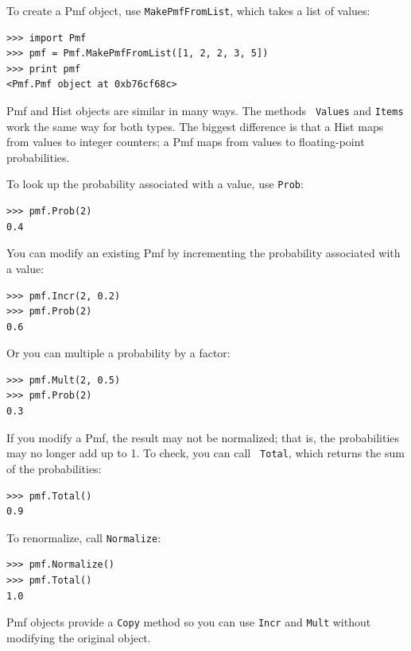 \documentclass[12pt]{book}
\begin{document}
To create a Pmf object, use {\tt MakePmfFromList}, which takes a list
of values:

\begin{verbatim}
>>> import Pmf
>>> pmf = Pmf.MakePmfFromList([1, 2, 2, 3, 5])
>>> print pmf
<Pmf.Pmf object at 0xb76cf68c>
\end{verbatim}

Pmf and Hist objects are similar in many ways.  The methods {\tt
  Values} and {\tt Items} work the same way for both types.  The
biggest difference is that a Hist maps from values to integer
counters; a Pmf maps from values to floating-point probabilities.

To look up the probability associated with a value, use {\tt Prob}:

\begin{verbatim}
>>> pmf.Prob(2)
0.4
\end{verbatim}

You can modify an existing Pmf by incrementing the probability
associated with a value:

\begin{verbatim}
>>> pmf.Incr(2, 0.2)
>>> pmf.Prob(2)
0.6
\end{verbatim}

Or you can multiple a probability by a factor:

\begin{verbatim}
>>> pmf.Mult(2, 0.5)
>>> pmf.Prob(2)
0.3
\end{verbatim}

If you modify a Pmf, the result may not be normalized; that is, the
probabilities may no longer add up to 1.  To check, you can call {\tt
  Total}, which returns the sum of the probabilities:

\begin{verbatim}
>>> pmf.Total()
0.9
\end{verbatim}

To renormalize, call {\tt Normalize}:

\begin{verbatim}
>>> pmf.Normalize()
>>> pmf.Total()
1.0
\end{verbatim}

Pmf objects provide a {\tt Copy} method so you can
use {\tt Incr} and {\tt Mult} without modifying the original object.
\end{document}
